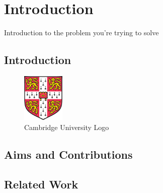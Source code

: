 \chapter{Introduction}
\label{chap:introduction}

Introduction to the problem you're trying to solve

\section{Introduction}


\begin{figure}[h]
    \includegraphics[width=2cm]{figures/cambridge.eps}
    \caption{Cambridge University Logo}
\end{figure}



\section{Aims and Contributions}


\section{Related Work}
